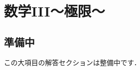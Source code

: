 \documentclass[../../ms_a.tex]{subfiles}
\begin{document}
\section{数学III～極限～}

\subsection*{準備中}
この大項目の解答セクションは整備中です．
\end{document}
